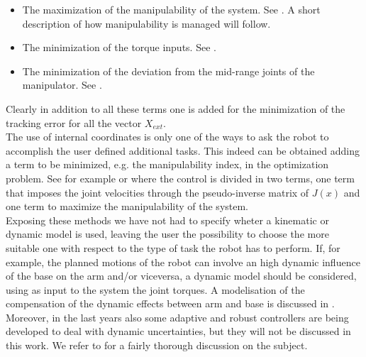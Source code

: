 \begin{itemize}
	\item The maximization of the manipulability of the system. See \cite{yamamoto}. A short description of how manipulability is managed will follow.
	\item The minimization of the torque inputs. See \cite{chen1997dynamic}.
	\item The minimization of the deviation from the mid-range joints of the manipulator. See \cite{khatib1999}.
\end{itemize}
Clearly in addition to all these terms one is added for the minimization of the tracking error for all the vector $X_{ext}$.\\
The use of internal coordinates is only one of the ways to ask the robot to accomplish the user defined additional tasks. This indeed can be obtained adding a term to be minimized, e.g. the manipulability index, in the optimization problem. See for example \cite{bayle1} or \cite{bayle2} where the control is divided in two terms, one term that imposes the joint velocities  through the pseudo-inverse matrix of $J(x)$ and one term to maximize the manipulability of the system.\\
Exposing these methods we have not had to specify wheter a kinematic or dynamic model is used, leaving the user the possibility to choose the more suitable one with respect to the type of task the robot has to perform. If, for example, the planned motions of the robot can involve an high dynamic influence of the base on the arm and/or viceversa, a dynamic model should be considered, using as input to the system the joint torques. A modelisation of the compensation of the dynamic effects between arm and base is discussed in \cite{yamamoto1}.
Moreover, in the last years also some adaptive and robust controllers are being developed to deal with dynamic uncertainties, but they will not be discussed in this work. We refer to \cite{libromobilemanipulators} for a fairly thorough discussion on the subject.

